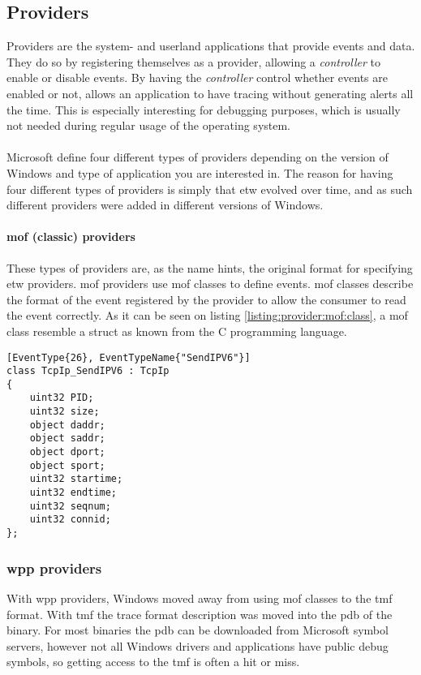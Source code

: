 \documentclass{report}
\begin{document}
\subsection{Providers}
\label{sec:etw:providers}
Providers are the system- and userland applications that provide events and data. They do so by registering themselves as a provider, allowing a \emph{controller} to enable or disable events. By having the \emph{controller} control whether events are enabled or not, allows an application to have tracing without generating alerts all the time. This is especially interesting for debugging purposes, which is usually not needed during regular usage of the operating system.
\\
\\
Microsoft define four different types of providers depending on the version of Windows and type of application you are interested in. The reason for having four different types of providers is simply that \gls{etw} evolved over time, and as such different providers were added in different versions of Windows\cite{url:etw:provider-types}.

\paragraph{\gls{mof} (classic) providers}
These types of providers are, as the name hints, the original format for specifying \gls{etw} providers. \gls{mof} providers use \gls{mof} classes\cite{url:etw:provider-types:mof:classes} to define events. \gls{mof} classes describe the format of the event registered by the provider to allow the consumer to read the event correctly. As it can be seen on listing \ref{listing:provider:mof:class}, a \gls{mof} class resemble a struct as known from the C programming language.

\begin{listing}[H]
\begin{verbatim}
[EventType{26}, EventTypeName{"SendIPV6"}]
class TcpIp_SendIPV6 : TcpIp
{
    uint32 PID;
    uint32 size;
    object daddr;
    object saddr;
    object dport;
    object sport;
    uint32 startime;
    uint32 endtime;
    uint32 seqnum;
    uint32 connid;
};
\end{verbatim}
\caption{\texttt{TcpIp_SendIPV6 : TcpIp} \gls{mof} class}
\label{listing:provider:mof:class}
\end{listing}

\subsubsection{\gls{wpp} providers}
With \gls{wpp} providers, Windows moved away from using \gls{mof} classes to the \gls{tmf} format. With \gls{tmf} the trace format description was moved into the \gls{pdb} of the binary. For most binaries the \gls{pdb} can be downloaded from Microsoft symbol servers\cite{url:microsoft:public-symbol-server}, however not all Windows drivers and applications have public debug symbols, so getting access to the \gls{tmf} is often a hit or miss.
\end{document}
